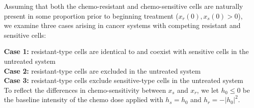 \documentclass{article}
\theoremstyle{definition}
\begin{document}
Assuming that both the chemo-resistant and chemo-sensitive cells are naturally present in some proportion prior to beginning treatment ($x_r(0), x_s(0) > 0$), we examine three cases arising in cancer systems with competing resistant and sensitive cells:

\noindent \textbf{Case 1:} resistant-type cells are identical to and coexist with sensitive cells in the untreated system \\%
\noindent \textbf{Case 2:} resistant-type cells are excluded in the untreated system \\%
\noindent \textbf{Case 3:} resistant-type cells exclude sensitive-type cells in the untreated system\\ %


\noindent To reflect the differences in chemo-sensitivity between $x_s$ and $x_r$, we let $h_0 \leq 0$ be the baseline intensity of the chemo dose applied with $h_s = h_0$ and $h_r = -|h_0|^2$. 
\end{document}
